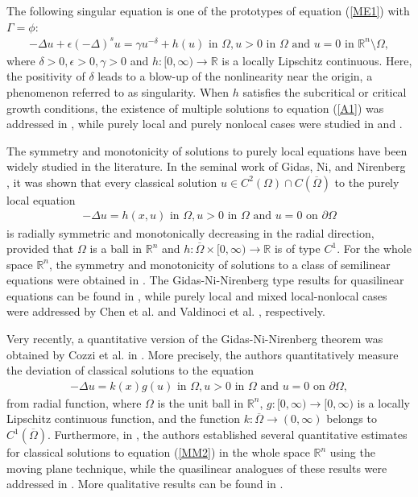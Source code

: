 \documentclass[11pt, notitlepage]{article}
\def\R{\mathbb{R}}
\newcommand{\De} {\Delta}
\begin{document}
{\begin{itemize}
\end{itemize}
The following singular equation is one of the prototypes of equation (\ref{ME1}) with $\Gamma=\phi$:
\begin{align}\label{A1}
    -\De u+\epsilon(-\De )^su=\gamma u^{-\delta}+h(u) \text{ in } \Omega,
    u>0 \text{ in }\Omega \text{ and }u=0\text{ in }\R^n\setminus \Omega,
\end{align}
where $\delta>0,\epsilon>0,\gamma>0$ and $h:[0,\infty)\to\R$ is a locally Lipschitz continuous. Here, the positivity of $\delta$ leads to a blow-up of the nonlinearity near the origin, a phenomenon referred to as singularity. When $h$ satisfies the subcritical or critical growth conditions, the existence of multiple solutions to equation (\ref{A1}) was addressed in \cite{ BV24, Sanjit, PG}, while purely local and purely nonlocal cases were studied in \cite{ADICCM, Haitao} and \cite{ST16}.

The symmetry and monotonicity of solutions to purely local equations have been widely studied in the literature. In the seminal work of Gidas, Ni, and Nirenberg \cite{Gidas}, it was shown that every classical solution $u\in C^2(\Omega)\cap C(\overline{\Omega})$ to the purely local equation 
\begin{align}\label{A2}
    -\Delta u=h(x,u)\text{ in }\Omega, u>0 \text{ in }\Omega \text{ and }u=0\text{ on }\partial\Omega
\end{align}
is radially symmetric and monotonically decreasing in the radial direction, provided that $\Omega$ is a ball in $\R^n$ and $h:\overline{\Omega}\times[0,\infty)\to\R$ is of type $C^1$. For the whole space $\R^n$, the symmetry and monotonicity of solutions to a class of semilinear equations were obtained in \cite{CaffCPAM, Chen91}. The Gidas-Ni-Nirenberg type results for quasilinear equations can be found in \cite{DP98, DS}, while purely local and mixed local-nonlocal cases were addressed by Chen et al. \cite{ChenLi17} and Valdinoci et al. \cite{BV21}, respectively. 

Very recently, a quantitative version of the Gidas-Ni-Nirenberg theorem was obtained by Cozzi et al. in \cite{Cozzi24}. More precisely, the authors quantitatively measure the deviation of classical solutions to the equation
\begin{align}\label{MM2}
         -\Delta u=k(x)g(u)\text{ in }\Omega,
        u>0\text{ in }\Omega \text{ and }u=0 \text{ on }\partial\Omega,
\end{align}
from radial function, where $\Omega$ is the unit ball in $\R^n$, $g:[0,\infty)\to[0,\infty)$ is a locally Lipschitz continuous function, and the function $k:\overline{\Omega}\to (0,\infty)$ belongs to $C^1(\overline{\Omega})$. Furthermore, in \cite{Cozzi25}, the authors established several quantitative estimates for classical solutions to equation (\ref{MM2}) in the whole space $\R^n$ using the moving plane technique, while the quasilinear analogues of these results were addressed in \cite{Gatti}. More qualitative results can be found in \cite{Li25, Serena25}.

}
\end{document}
